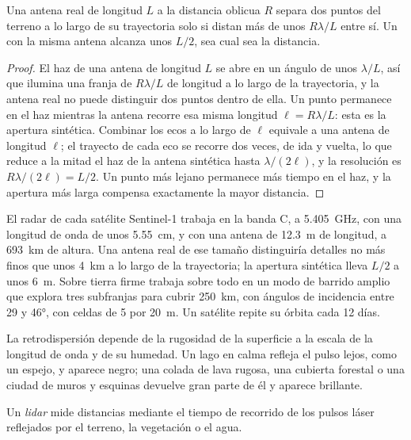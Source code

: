 \begin{proposition}\label{prop:b3:remote-sensing-gis:azimuth}
Una antena real de longitud $L$ a la distancia oblicua $R$ separa dos puntos del
terreno a lo largo de su trayectoria solo si distan más de unos $R\lambda/L$
entre sí. Un  con la misma antena alcanza unos $L/2$,
sea cual sea la distancia.
\end{proposition}

\begin{proof}
El haz de una antena de longitud $L$ se abre en un ángulo de unos
$\lambda/L$, así que ilumina una franja de $R\lambda/L$ de longitud a lo largo de la trayectoria, y
la antena real no puede distinguir dos puntos dentro de ella. Un punto permanece en
el haz mientras la antena recorre esa misma longitud $\ell = R\lambda/L$:
esta es la apertura sintética. Combinar los ecos a lo largo de $\ell$ equivale
a una antena de longitud $\ell$; el trayecto de cada eco se recorre
dos veces, de ida y vuelta, lo que reduce a la mitad el haz de la antena
sintética hasta $\lambda/(2\ell)$, y la resolución es $R\lambda/(2\ell) =
L/2$. Un punto más lejano permanece más tiempo en el haz, y la apertura más larga
compensa exactamente la mayor distancia.
\end{proof}

El radar de cada satélite Sentinel-1 trabaja en la banda C, a
\qty{5.405}{GHz}, con una longitud de onda de unos \qty{5.55}{cm}, y con una antena
de \qty{12.3}{m} de longitud, a \qty{693}{km} de altura. Una antena real de ese tamaño
distinguiría detalles no más finos que unos \qty{4}{km} a lo largo de la trayectoria; la apertura sintética
lleva $L/2$ a unos \qty{6}{m}. Sobre tierra firme trabaja sobre todo en un
modo de barrido amplio que explora tres subfranjas para cubrir \qty{250}{km}, con
ángulos de incidencia entre 29 y \ang{46}, con celdas de 5 por \qty{20}{m}.
Un satélite repite su órbita cada 12 días.

La retrodispersión depende de la rugosidad de la superficie a la escala de la
longitud de onda y de su humedad. Un lago en calma refleja el pulso lejos, como un
espejo, y aparece negro; una colada de lava rugosa, una cubierta forestal o una ciudad de muros
y esquinas devuelve gran parte de él y aparece brillante.

\begin{definition}[Lidar]\label{def:b3:remote-sensing-gis:lidar}
Un \emph{lidar} mide distancias mediante el tiempo de recorrido de los
pulsos láser reflejados por el terreno, la vegetación o el agua.
\end{definition}

